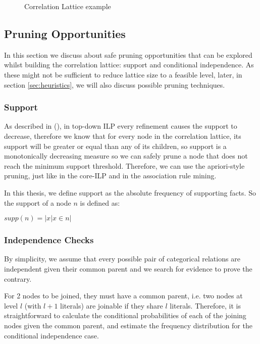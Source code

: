 \begin{figure}[!h]
  \caption{Correlation Lattice example}
  \centering
  \begin{tikzpicture}
  [scale=1.8,auto=center,every node/.style={draw=black, font=\tiny}]
  
  \end{tikzpicture}
  \label{fig:lattice}
\end{figure}

\subsection{Pruning Opportunities}

In this section we discuss about safe pruning opportunities that can be explored whilst building the correlation
lattice: support and conditional independence. As these might not be sufficient to reduce lattice size to a feasible
level, later, in section \ref{sec:heuristics}, we will also discuss possible pruning techniques.

\subsubsection{Support}

As described in (\cite{LavracDz94}), in top-down ILP every refinement causes the support to decrease, therefore we know
that for every node in the correlation lattice, its support will be greater or equal than any of its children, so
support is a monotonically decreasing measure so we can safely prune a node that does not reach the minimum support
threshold. Therefore, we can use the apriori-style pruning, just like in the core-ILP and in the association rule
mining.

In this thesis, we define support as the absolute frequency of supporting facts. So the support of a node $n$ is
defined as:

$supp(n)=|{x|x \in n}|$


\subsubsection{Independence Checks}

By simplicity, we assume that every possible pair of categorical relations are independent given their common parent and
we search for evidence to prove the contrary.

For 2 nodes to be joined, they must have a common parent, i.e. two nodes at level $l$ (with $l+1$ literals) are joinable
if they share $l$ literals. Therefore, it is straightforward to calculate the conditional probabilities of each of the
joining nodes given the common parent, and estimate the frequency distribution for the conditional independence case.

